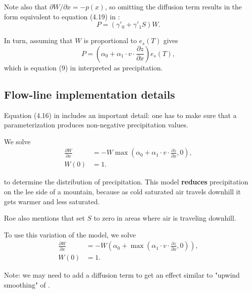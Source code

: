\documentclass[11pt]{article}
\begin{document}
Note also that $\partial W / \partial x = - p(x)$, so omitting the
diffusion term results in the form equivalent to equation (4.19) in
\cite{roe1999wobbly}:
\begin{equation}
P = (\gamma'_0 + \gamma'_1 S) W.
\end{equation}

In turn, assuming that $W$ is proportional to $e_s(T)$ gives
\begin{equation}
P = \left( \alpha_0 + \alpha_1 \cdot v \cdot \frac{\partial z}{\partial x} \right) e_s(T),
\end{equation}
which is equation (9) in \cite{roe2003orographic} interpreted as precipitation.

\subsection{Flow-line implementation details}
\label{sec-1-2}

Equation (4.16) in \cite{roe1999wobbly} includes an important
detail: one has to make sure that a parameterization produces
non-negative precipitation values.

We solve
\begin{align}
  \frac{\partial W}{\partial x} &= -W \max\left(\alpha_0 + \alpha_1 \cdot v \cdot \frac{\partial z}{\partial x}, 0 \right),\\
  W(0) &= 1.
\end{align}

to determine the distribution of precipitation. This model \textbf{reduces}
precipitation on the lee side of a mountain, because as cold
saturated air travels downhill it gets warmer and less saturated.

Roe \cite{roe1999wobbly} also mentions that
\cite{sanberg1983modelling} set $S$ to zero in areas where air is
traveling downhill.

To use this variation of the model, we solve
\begin{align}
  \frac{\partial W}{\partial x} &= -W \left( \alpha_0 + \max\left(\alpha_1 \cdot v \cdot \frac{\partial z}{\partial x}, 0 \right) \right),\\
  W(0) &= 1.
\end{align}

Note: we may need to add a diffusion term to get an effect similar
to "upwind smoothing" of \cite{roe2003orographic}.
\end{document}
